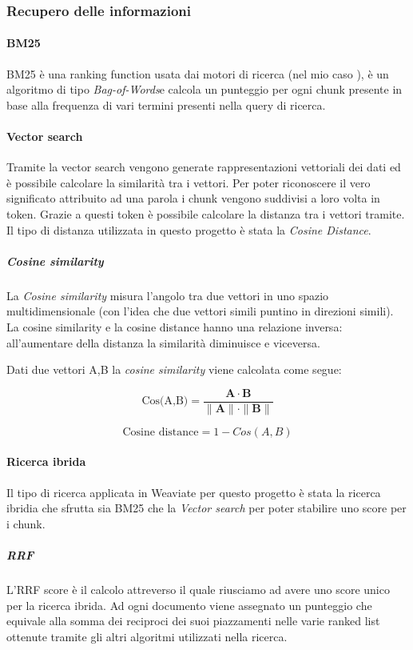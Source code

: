 \subsubsection{Recupero delle informazioni}
\label{subsubsec:rec-inf}
\paragraph{\gls{BM25}}
BM25 è una ranking function usata dai motori di ricerca (nel mio caso ), è un algoritmo di tipo \emph{\gls{Bag-of-Words}}\glsfirstoccur e calcola un punteggio per ogni chunk
presente in base alla frequenza di vari termini presenti nella query di ricerca. 

\paragraph{Vector search}
Tramite la vector search vengono generate rappresentazioni vettoriali dei dati ed è possibile calcolare la similarità tra i vettori.
Per poter riconoscere il vero significato attribuito ad una parola i chunk vengono suddivisi a loro volta in token.
Grazie a questi token è possibile calcolare la distanza tra i vettori tramite.
Il tipo di distanza utilizzata in questo progetto è stata la \emph{Cosine Distance}.

\subparagraph{Cosine similarity}
La \emph{Cosine similarity} misura l'angolo tra due vettori in uno spazio multidimensionale (con l'idea che due vettori simili puntino in direzioni simili).
La cosine similarity e la cosine distance hanno una relazione inversa: all'aumentare della distanza la similarità diminuisce e viceversa.

\noindent Dati due vettori A,B la \emph{cosine similarity} viene calcolata come segue:

\[
\text{Cos(A,B)} = \frac{{\mathbf{A} \cdot \mathbf{B}}}{{\|\mathbf{A}\| \cdot \|\mathbf{B}\|}}    
\]

\[
\text{Cosine distance} = 1-Cos(A,B)
\]

\paragraph{Ricerca ibrida}
Il tipo di ricerca applicata in Weaviate per questo progetto è stata la ricerca ibridia che sfrutta sia BM25 che la \emph{Vector search} per poter stabilire uno score per i chunk.

\subparagraph{\gls{RRF}}
L'RRF score è il calcolo attreverso il quale riusciamo ad avere uno score unico per la ricerca ibrida.
Ad ogni documento viene assegnato un punteggio che equivale alla somma dei reciproci dei suoi piazzamenti nelle varie ranked list ottenute tramite gli altri algoritmi utilizzati nella ricerca.

